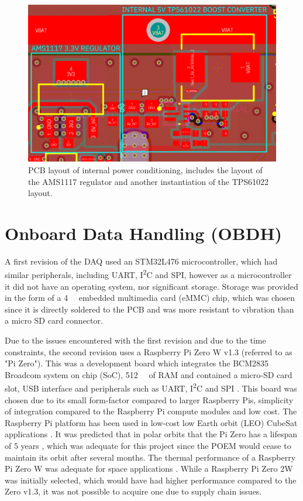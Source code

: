 \documentclass{report}
\newcommand{\iic}{{I\textsuperscript{2}C}}
\begin{document}
\begin{figure}[H]
  \centering
  \includegraphics[width=\linewidth]{images/internal-power-supply.png}
  \caption{PCB layout of internal power conditioning, includes the layout of the AMS1117 regulator and another instantiation of the TPS61022 layout.}
  \label{fig:internal-power-supply}
\end{figure}

\section{Onboard Data Handling (OBDH)}

A first revision of the DAQ used an STM32L476 microcontroller, which had similar peripherals, including UART, {\iic} and SPI, however as a microcontroller it did not have an operating system, nor significant storage. Storage was provided in the form of a \SI{4}{\giga\byte} embedded multimedia card (eMMC) chip, which was chosen since it is directly soldered to the PCB and was more resistant to vibration than a micro SD card connector.

Due to the issues encountered with the first revision and due to the time constraints, the second revision uses a Raspberry Pi Zero W v1.3 (referred to as "Pi Zero"). This was a development board which integrates the BCM2835 Broadcom system on chip (SoC), \SI{512}{\mega\byte} of RAM and contained a micro-SD card slot, USB interface and peripherals such as UART, {\iic} and SPI \cite{upton2016raspberry}. This board was chosen due to its small form-factor compared to larger Raspberry Pis, simplicity of integration compared to the Raspberry Pi compute modules and low cost. The Raspberry Pi platform has been used in low-cost low Earth orbit (LEO) CubeSat applications \cite{guertin2022raspberry}. It was predicted that in polar orbits that the Pi Zero has a lifespan of 5 years \cite{guertin2022raspberry}, which was adequate for this project since the POEM would cease to maintain its orbit after several months. The thermal performance of a Raspberry Pi Zero W was adequate for space applications \cite{guertin2022raspberry}. While a Raspberry Pi Zero 2W was initially selected, which would have had higher performance compared to the Zero v1.3, it was not possible to acquire one due to supply chain issues.
\end{document}
